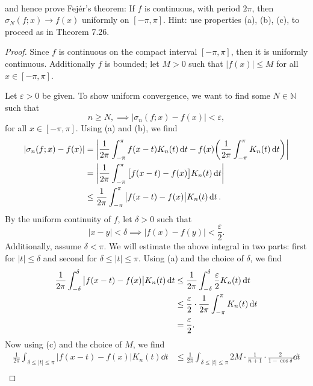 \documentclass[12pt]{article}
\newenvironment{fullbox}{\begin{lrbox}{\savefullbox}\begin{minipage}{\dimexpr\textwidth-2\fboxsep\relax}}{\end{minipage}\end{lrbox}\begin{center}\framebox[\textwidth]{\usebox{\savefullbox}}\end{center}}
\newenvironment{pbox}[1][]{\begin{fullbox}\ifx#1\empty\else\paragraph{#1}\fi}{\end{fullbox}}
\theoremstyle{definition}
\newcommand{\N}{\mathbb{N}}
\newcommand{\eps}{\varepsilon}
\begin{document}
\newpage
\begin{pbox}[]
    and hence prove Fej\'er's theorem: If $f$ is continuous, with period $2\pi$, then $\sigma_N(f; x) \to f(x)$ uniformly on $[-\pi, \pi]$. Hint: use properties (a), (b), (c), to proceed as in Theorem 7.26.
\end{pbox}

\begin{proof}
    Since $f$ is continuous on the compact interval $[-\pi, \pi]$, then it is uniformly continuous. Additionally $f$ is bounded; let $M > 0$ such that $|f(x)| \leq M$ for all $x \in [-\pi, \pi]$. 

    Let $\eps > 0$ be given. To show uniform convergence, we want to find some $N \in \N$ such that
    \[
        n \geq N, \implies |\sigma_n(f; x) - f(x)| < \eps,
    \]
    for all $x \in [-\pi, \pi]$. Using (a) and (b), we find
    \begin{align*}
        |\sigma_n(f; x) - f(x)|
            &= \abs{\frac{1}{2\pi} \int_{-\pi}^{\pi} f(x - t) K_n(t) \dd{t} - f(x) \qty(\frac{1}{2\pi} \int_{-\pi}^{\pi} K_n(t) \dd{t})} \\
            &= \abs{\frac{1}{2\pi} \int_{-\pi}^{\pi} \qty\big[f(x - t) - f(x)] K_n(t) \dd{t}} \\
            &\leq \frac{1}{2\pi} \int_{-\pi}^{\pi} \abs\big{f(x - t) - f(x)} K_n(t) \dd{t}.
    \end{align*}
    By the uniform continuity of $f$, let $\delta > 0$ such that 
    \[
        |x - y| < \delta \implies |f(x) - f(y)| < \frac{\eps}{2}.
    \]
    Additionally, assume $\delta < \pi$. We will estimate the above integral in two parts: first for $|t| \leq \delta$ and second for $\delta \leq |t| \leq \pi$. Using (a) and the choice of $\delta$, we find
    \begin{align*}
        \frac{1}{2\pi} \int_{-\delta}^{\delta} \abs\big{f(x - t) - f(x)} K_n(t) \dd{t}
            &\leq \frac{1}{2\pi} \int_{-\delta}^{\delta} \frac{\eps}{2} K_n(t) \dd{t} \\
            &\leq \frac{\eps}{2} \cdot \frac{1}{2\pi} \int_{-\pi}^{\pi}K_n(t) \dd{t} \\
            &= \frac{\eps}{2}.
    \end{align*}
    Now using (c) and the choice of $M$, we find
    \begin{align*}
        \frac{1}{2\pi} \int_{\delta \leq |t| \leq \pi} \big|f(x - t) - f(x)\big| K_n(t) \dd{t}
            &\leq \frac{1}{2\pi} \int_{\delta \leq |t| \leq \pi} 2M \cdot \frac{1}{n + 1} \cdot \frac{2}{1 - \cos \delta} \dd{t} \\

\end{align*}
\end{proof}
\end{document}
